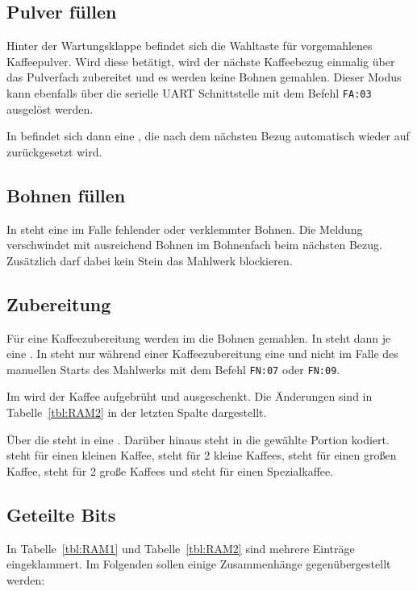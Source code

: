 \subsection{Pulver füllen}
Hinter der Wartungsklappe befindet sich die Wahltaste für vorgemahlenes Kaffeepulver.
Wird diese betätigt, wird der nächste Kaffeebezug einmalig über das Pulverfach zubereitet und es werden keine Bohnen gemahlen.
Dieser Modus kann ebenfalls über die serielle \ac{UART} Schnittstelle mit dem Befehl \texttt{FA:03} ausgelöst werden.

In  befindet sich dann eine , die nach dem nächsten Bezug automatisch wieder auf  zurückgesetzt wird.

\subsection{Bohnen füllen}
In  steht eine  im Falle fehlender oder verklemmter Bohnen.
Die Meldung verschwindet mit ausreichend Bohnen im Bohnenfach beim nächsten Bezug.
Zusätzlich darf dabei kein Stein das Mahlwerk blockieren.

\subsection{Zubereitung}\label{subsec:RAM:Zubereitung} %
Für eine Kaffeezubereitung werden im  die Bohnen gemahlen.
In  steht dann je eine .
In  steht nur während einer Kaffeezubereitung eine  und nicht im Falle des manuellen Starts des Mahlwerks mit dem Befehl \texttt{FN:07} oder \texttt{FN:09}.

Im  wird der Kaffee aufgebrüht und ausgeschenkt.
Die Änderungen sind in Tabelle~\ref{tbl:RAM2} in der letzten Spalte dargestellt.

Über die  steht in  eine .
Darüber hinaus steht in  die gewählte Portion kodiert.
 steht für einen kleinen Kaffee,  steht für 2 kleine Kaffees,  steht für einen großen Kaffee,  steht für 2 große Kaffees und  steht für einen Spezialkaffee.

\subsection{Geteilte Bits}
In Tabelle~\ref{tbl:RAM1} und Tabelle~\ref{tbl:RAM2} sind mehrere Einträge eingeklammert.
Im Folgenden sollen einige Zusammenhänge gegenübergestellt werden:

